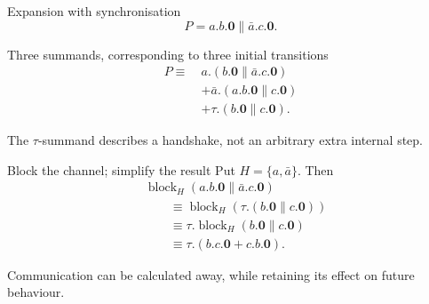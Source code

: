 \documentclass[handout,aspectratio=169,11pt]{beamer}
\newcommand{\nil}{\mathbf 0}
\newcommand{\blockact}[2]{\operatorname{block}_{#1}(#2)}
\newcommand{\Takeaway}[1]{\begin{exampleblock}{}#1\end{exampleblock}}
\begin{document}
\begin{frame}{Expansion with synchronisation}
  \[
     P=a.b.\nil\parallel\bar a.c.\nil.
  \]
  \begin{block}{Three summands, corresponding to three initial transitions}
    \begin{align*}
      P\equiv\ {}&a.(b.\nil\parallel\bar a.c.\nil)\\
             &+\bar a.(a.b.\nil\parallel c.\nil)\\
             &+\tau.(b.\nil\parallel c.\nil).
    \end{align*}
  \end{block}
  \Takeaway{The $\tau$-summand describes a handshake, not an arbitrary extra internal step.}
\end{frame}

\begin{frame}{Block the channel; simplify the result}
  Put $H=\{a,\bar a\}$. Then
  \begin{align*}
  &\blockact{H}{a.b.\nil\parallel\bar a.c.\nil}\\[2mm]
  &\qquad\equiv \blockact{H}{\tau.(b.\nil\parallel c.\nil)}\\[2mm]
  &\qquad\equiv \tau.\blockact{H}{b.\nil\parallel c.\nil}\\[2mm]
  &\qquad\equiv \boxed{\tau.(b.c.\nil+c.b.\nil)}.
  \end{align*}
  \vspace{1mm}
  \Takeaway{Communication can be calculated away, while retaining its effect on future behaviour.}
\end{frame}
\end{document}

